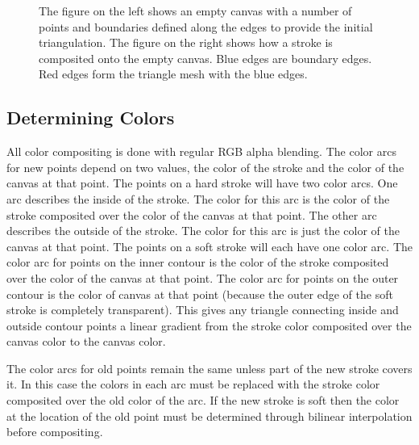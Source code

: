 \documentclass[review]{acmsiggraph}
\begin{document}
\begin{figure}
    \centering
    \caption{The figure on the left shows an empty canvas with a number of points and boundaries defined along the edges
             to provide the initial triangulation. The figure on the right shows how a stroke is composited onto
             the empty canvas. Blue edges are boundary edges. Red edges form the triangle mesh with the blue edges.}
    \label{fig:firststrokes}
\end{figure}


\subsection{Determining Colors}
All color compositing is done with regular RGB alpha blending.  The color arcs for new points depend on two values, the color of the stroke and the color
of the canvas at that point. The points on a hard stroke will have two color arcs. One
arc describes the inside of the stroke. The color for this arc is the color of the stroke
composited over the color of the canvas at that point. The other arc describes the outside
of the stroke. The color for this arc is just the color of the canvas at that point. The
points on a soft stroke will each have one color arc. The color arc for points on the inner
contour is the color of the stroke composited over the color of the canvas at that point.
The color arc for points on the outer contour is the color of canvas at that point (because the outer edge of the soft stroke is completely transparent).
This gives any triangle connecting inside and outside contour points a linear gradient
from the stroke color composited over the canvas color to the canvas color.

The color arcs for old points remain the same unless part of the new stroke covers it.
In this case the colors in each arc must be replaced with the stroke color composited over
the old color of the arc. If the new stroke is soft then the color at the location of
the old point must be determined through bilinear interpolation before compositing.
\end{document}
